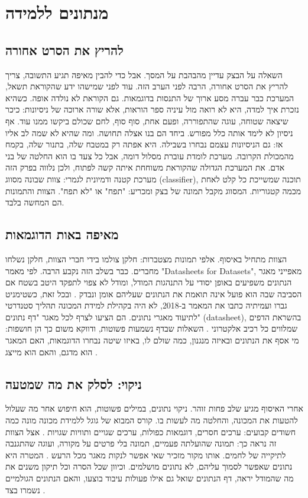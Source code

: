 \chapter{מנתונים ללמידה}\label{ch:02}
\section{להריץ את הסרט אחורה}
השאלה על הבצק עדיין מהבהבת על המסך. אבל כדי להבין מאיפה תגיע התשובה, צריך להריץ את הסרט אחורה, הרבה לפני הערב הזה. עוד לפני שמישהו ידע שהקוראת תשאל, המערכת כבר עברה מסע ארוך של התנסות בדוגמאות.
גם הקוראת לא נולדה אופה. כשהיא נזכרת איך למדה, היא לא רואה מול עיניה ספר הוראות, אלא שורה ארוכה של ניסיונות: כיכר שיצאה שטוחה, עוגה שהתפוררה, ופעם אחת, סוף סוף, לחם שכולם ביקשו ממנו עוד. אף ניסיון לא לימד אותה כלל מפורש. ביחד הם בנו אצלה תחושה. ומה שהיא לא שמה לב אליו אז: גם הניסיונות עצמם נבחרו בשבילה. היא אפתה רק במטבח שלה, בתנור שלה, בקמח מהמכולת הקרובה.
מערכת לומדת עוברת מסלול דומה, אבל כל צעד בו הוא החלטה של בני אדם. את המערכת הגדולה שהקוראת משוחחת איתה קשה לפתוח, ולכן נלווה בפרק הזה מערכת קטנה ודמיונית לגמרי: צוות שבונה מסווג (classifier), תוכנה שמשייכת כל קלט לאחת מכמה קטגוריות. המסווג מקבל תמונה של בצק ומכריע: "תפח" או "לא תפח". הצוות והתמונות הם המחשה בלבד.
\section{מאיפה באות הדוגמאות}
הצוות מתחיל באיסוף. אלפי תמונות מצטברות: חלקן צולמו בידי חברי הצוות, חלקן נשלחו מחברים. כבר בשלב הזה נקבע הרבה. לפי מאמר "Datasheets for Datasets", מאפייני מאגר הנתונים משפיעים באופן יסודי על התנהגות המודל, ומודל לא צפוי לתפקד היטב בשטח אם הסביבה שבה הוא פועל אינה תואמת את הנתונים שעליהם אומן ונבדק \cite{S-ch02-04}.
ובכל זאת, כשטימניט גברו ועמיתיה כתבו את המאמר ב-2018, לא היה בקהילת למידת המכונה תהליך סטנדרטי לתיעוד מאגרי נתונים. הם הציעו לצרף לכל מאגר "דף נתונים" (datasheet), בהשראת הדפים שמלווים כל רכיב אלקטרוני \cite{S-ch02-03}. השאלות שבדף נשמעות פשוטות, ודווקא משום כך הן חושפות: מי אסף את הנתונים ובאיזה מנגנון, כמה שולם לו, באיזו שיטה נבחרו הדוגמאות, האם המאגר הוא מדגם, והאם הוא מייצג \cite{S-ch02-04}.
\section{ניקוי: לסלק את מה שמטעה}
אחרי האיסוף מגיע שלב פחות זוהר. ניקוי נתונים, במילים פשוטות, הוא חיפוש אחר מה שעלול להטעות את המכונה, והחלטה מה לעשות בו. קורס המבוא של גוגל ללמידת מכונה מונה כמה חשודים קבועים: ערכים חסרים, דוגמאות כפולות, ערכים שגויים ותוויות שגויות \cite{S-ch02-13}. אצל הצוות זה נראה כך: תמונה שהועלתה פעמיים, תמונה בלי פרטים על מקורה, ועוגה שהתגנבה לתיקייה של לחמים.
אותו מקור מזכיר שאי אפשר לנקות מאגר מכל הרעש \cite{S-ch02-13}. המטרה היא נתונים שאפשר לסמוך עליהם, לא נתונים מושלמים. וכיוון שכל הסרה וכל תיקון משנים את מה שהמודל יראה, דף הנתונים שואל גם אילו פעולות עיבוד בוצעו, והאם הנתונים הגולמיים נשמרו בצד \cite{S-ch02-04}.
